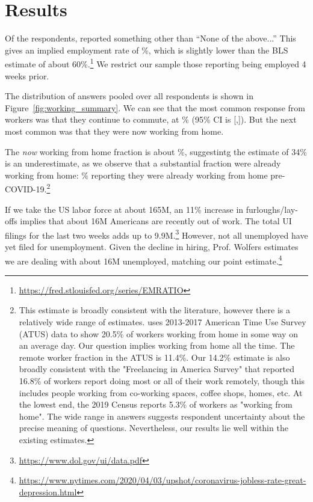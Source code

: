 \documentclass[12pt]{article}
\begin{document}
\section{Results}

Of the respondents, \numObsWorking{} reported something other than ``None of the above...''
This gives an implied employment rate of \LFPRhat{}\%, which is slightly lower than the BLS estimate of about 60\%.\footnote{
  \url{https://fred.stlouisfed.org/series/EMRATIO}
}
We restrict our sample those reporting being employed 4 weeks prior.

The distribution of answers pooled over all respondents is shown in Figure~\ref{fig:working_summary}. 
We can see that the most common response from workers was that they continue to commute, at \stillCommute{}\% (95\% CI is [\stillCommuteLB,\stillCommuteUB]). 
But the next most common was that they were now working from home. 

The \emph{now} working from home fraction is about \WFH{}\%, suggestintg the \cite{dingel2020} estimate of 34\% is an underestimate, as we observe that a substantial fraction were already working from home: \alreadyWFH{}\% reporting they were already working from home pre-COVID-19.\footnote{


  
This estimate is broadly consistent with the literature, however there is a relatively wide range of estimates. \citep{WHATEVER KANT-KRENT 2019 is} uses 2013-2017 American Time Use Survey (ATUS) data to show 20.5\% of workers working from home in some way on an average day. Our question implies working from home all the time. The remote worker fraction in the ATUS is 11.4\%. Our 14.2\% estimate is also broadly consistent with the "Freelancing in America Survey" that reported 16.8\% of workers report doing most or all of their work remotely, though this includes people working from co-working spaces, coffee shops, homes, etc. At the lowest end, the 2019 Census reports 5.3\% of workers as "working from home". The wide range in answers suggests respondent uncertainty about the precise meaning of questions. Nevertheless, our results lie well within the existing estimates.

}

If we take the US labor force at about 165M, an 11\% increase in furloughs/lay-offs implies that about 16M Americans are recently out of work.
The total UI filings for the last two weeks adds up to 9.9M.\footnote{
  \url{https://www.dol.gov/ui/data.pdf}
}
However, not all unemployed have yet filed for unemployment.
Given the decline in hiring, Prof. Wolfers estimates we are dealing with about 16M unemployed, matching our point estimate.\footnote{
  \url{https://www.nytimes.com/2020/04/03/upshot/coronavirus-jobless-rate-great-depression.html}
}
\end{document}
